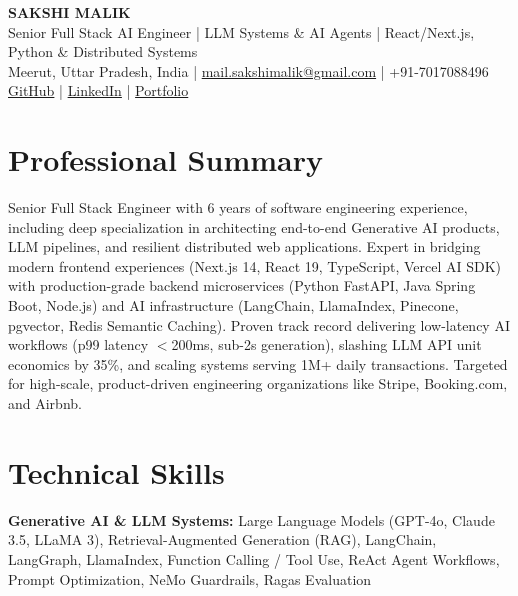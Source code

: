 \documentclass[10pt,a4paper]{article}
\begin{document}

\begin{center}
  {\LARGE\textbf{SAKSHI MALIK}}\\[3pt]
  {\normalsize
  Senior Full Stack AI Engineer \quad|\quad
  LLM Systems \& AI Agents \quad|\quad
  React/Next.js, Python \& Distributed Systems}\\[5pt]

  Meerut, Uttar Pradesh, India
  \quad|\quad
  \href{mailto:mail.sakshimalik@gmail.com}{mail.sakshimalik@gmail.com}
  \quad|\quad
  +91-7017088496\\[2pt]

  \href{https://github.com/sakshi-labs}{GitHub}
  \quad|\quad
  \href{https://linkedin.com/in/sakshiimalik}{LinkedIn}
  \quad|\quad
  \href{https://sakshi-labs.github.io/Portfolio/}{Portfolio}
\end{center}


\section{Professional Summary}

Senior Full Stack Engineer with 6 years of software engineering experience, including deep specialization in architecting end-to-end Generative AI products, LLM pipelines, and resilient distributed web applications. Expert in bridging modern frontend experiences (Next.js 14, React 19, TypeScript, Vercel AI SDK) with production-grade backend microservices (Python FastAPI, Java Spring Boot, Node.js) and AI infrastructure (LangChain, LlamaIndex, Pinecone, pgvector, Redis Semantic Caching). Proven track record delivering low-latency AI workflows (p99 latency $<$200ms, sub-2s generation), slashing LLM API unit economics by 35\%, and scaling systems serving 1M+ daily transactions. Targeted for high-scale, product-driven engineering organizations like Stripe, Booking.com, and Airbnb.


\section{Technical Skills}

\textbf{Generative AI \& LLM Systems:}
Large Language Models (GPT-4o, Claude 3.5, LLaMA 3), Retrieval-Augmented Generation (RAG), LangChain, LangGraph, LlamaIndex, Function Calling / Tool Use, ReAct Agent Workflows, Prompt Optimization, NeMo Guardrails, Ragas Evaluation
\end{document}
